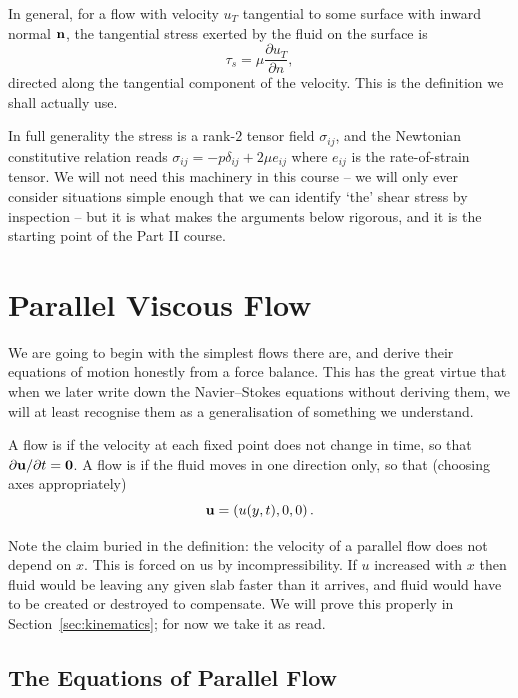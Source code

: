 \documentclass[a4paper]{scrartcl}
\newcommand{\pd}[2]{\frac{\partial #1}{\partial #2}}
\begin{document}
In general, for a flow with velocity $u_T$ tangential to some surface with inward normal $\mathbf{n}$, the tangential stress exerted by the fluid on the surface is
$$
\tau_s = \mu \pd{u_T}{n},
$$
directed along the tangential component of the velocity. This is the definition we shall actually use.

\begin{remark}
	In full generality the stress is a rank-$2$ tensor field $\sigma_{ij}$, and the Newtonian constitutive relation reads $\sigma_{ij} = -p \delta_{ij} + 2\mu e_{ij}$ where $e_{ij}$ is the rate-of-strain tensor. We will not need this machinery in this course -- we will only ever consider situations simple enough that we can identify `the' shear stress by inspection -- but it is what makes the arguments below rigorous, and it is the starting point of the Part II course.
\end{remark}

\section{Parallel Viscous Flow}

We are going to begin with the simplest flows there are, and derive their equations of motion honestly from a force balance. This has the great virtue that when we later write down the Navier--Stokes equations without deriving them, we will at least recognise them as a generalisation of something we understand.

\begin{definition}
	A flow is  if the velocity at each fixed point does not change in time, so that $\partial \mathbf{u} / \partial t = \mathbf{0}$. A flow is  if the fluid moves in one direction only, so that (choosing axes appropriately)
	$$
	\mathbf{u} = \left(u(y, t), 0, 0\right).
	$$
\end{definition}

Note the claim buried in the definition: the velocity of a parallel flow does not depend on $x$. This is forced on us by incompressibility. If $u$ increased with $x$ then fluid would be leaving any given slab faster than it arrives, and fluid would have to be created or destroyed to compensate. We will prove this properly in Section~\ref{sec:kinematics}; for now we take it as read.

\subsection{The Equations of Parallel Flow}
\end{document}
